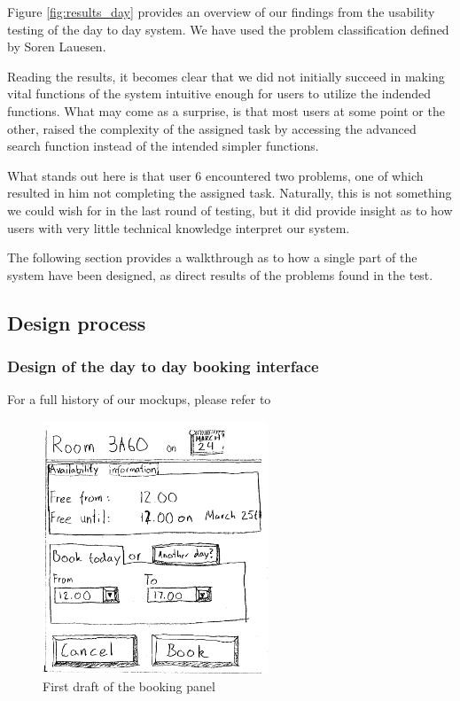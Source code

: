 Figure \ref{fig:results_day} provides an overview of our findings from the usability testing of the day to day system. We have used the problem classification defined by Soren Lauesen\cite{lauesen}.

Reading the results, it becomes clear that we did not initially succeed in making vital functions of the system intuitive enough for users to utilize the indended functions. What may come as a surprise, is that most users at some point or the other, raised the complexity of the assigned task by accessing the advanced search function instead of the intended simpler functions.

What stands out here is that user 6 encountered two problems, one of which resulted in him not completing the assigned task. Naturally, this is not something we could wish for in the last round of testing, but it did provide insight as to how users with very little technical knowledge interpret our system.

The following section provides a walkthrough as to how a single part of the system have been designed, as direct results of the problems found in the test.
\pagebreak
\subsection{Design process}
\label{sec:design_process}

\subsubsection{Design of the day to day booking interface}

For a full history of our mockups, please refer to %
\\
\begin{figure}[htb]
\begin{center}
\leavevmode
\includegraphics[width=0.6\textwidth]{images/bookRoomMockup}
\end{center}
\caption{First draft of the booking panel}
\label{fig:book_room_mockup}
\end{figure}

